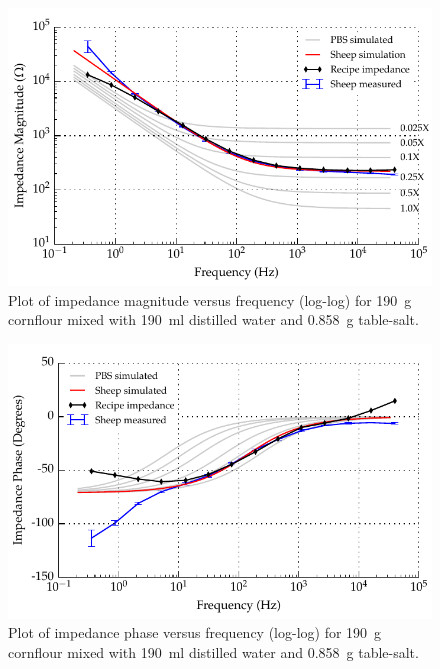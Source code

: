 \begin{figure}
    \centering
    \includegraphics[width=\textwidth]{content/pt2/graphics/run12_190ml-distilledWater_190g-cornflour_0g858-salt_ZVsF_graph_mag}
    \caption{\label{fig:recipe_cornflour_salt_extraWater_mag_improved}Plot of impedance magnitude versus frequency (log-log) for \SI{190}{\gram} cornflour mixed with \SI{190}{\milli\litre} distilled water and \SI{0.858}{\gram} table-salt.}
\end{figure}

\begin{figure}
    \centering
    \includegraphics[width=\textwidth]{content/pt2/graphics/run12_190ml-distilledWater_190g-cornflour_0g858-salt_ZVsF_graph_phase}
    \caption{\label{fig:recipe_cornflour_salt_extraWater_phase_improved}Plot of impedance phase versus frequency (log-log) for \SI{190}{\gram} cornflour mixed with \SI{190}{\milli\litre} distilled water and \SI{0.858}{\gram} table-salt.}
\end{figure}

